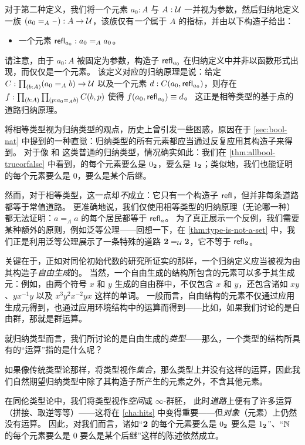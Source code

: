 对于第二种定义，我们将一个元素 $a_0:A$ 与 $A:\mathcal{U}$ 一并视为参数，然后归纳地定义一族 $(a_0 =_A \mathord{\hspace{1pt}\text{--}\hspace{1pt}}):A\to \mathcal{U}$，该族仅有\emph{一个}属于 $A$ 的指标，并由以下构造子给出：

\begin{itemize}
\item 一个元素 $\mathsf{refl}_{a_0} : a_0 =_A a_0$。
\end{itemize}

请注意，由于 $a_0:A$ 被固定为参数，构造子 $\mathsf{refl}_{a_0}$ 在归纳定义中并非以函数形式出现，而仅仅是一个元素。
该定义对应的归纳原理是说：给定 $C:\prd{b:A} (a_0 =_A b) \to \type$ 以及一个元素 $d:C(a_0,\mathsf{refl}_{a_0})$，则存在 $f:\prd{b:A}{p:a_0 =_A b} C(b,p)$ 使得 $f(a_0,\mathsf{refl}_{a_0})\equiv d$。
这正是相等类型的基于点的道路归纳原理。

将相等类型视为归纳类型的观点，历史上曾引发一些困惑，原因在于 \cref{sec:bool-nat} 中提到的一种直觉：归纳类型的所有元素都应当通过反复应用其构造子来得到。
对于像 \bool 和 \nat 这类普通的归纳类型，情况确实如此：我们在 \cref{thm:allbool-trueorfalse} 中看到，\bool 的每个元素要么是 ${0_{\mathbf{2}}}$，要么是 ${1_{\mathbf{2}}}$；类似地，我们也能证明 \nat 的每个元素要么是 $0$，要么是某个后继。

然而，对于相等类型，这一点却\emph{不}成立：它只有一个构造子 $\mathsf{refl}_{}$，但并非每条道路都等于常值道路。
更准确地说，我们仅使用相等类型的归纳原理（无论哪一种）都无法证明：$a=_A a$ 的每个居民都等于 $\mathsf{refl}_{a}$。
为了真正展示一个反例，我们需要某种额外的原则，例如泛等公理——回想一下，在 \cref{thm:type-is-not-a-set} 中，我们正是利用泛等公理展示了一条特殊的道路 $\mathbf{2}=_{\mathcal{U}}\mathbf{2}$，它不等于 $\mathsf{refl}_{\mathbf{2}}$。

%
%
关键在于，正如对同伦初始代数的研究所证实的那样，一个归纳定义应当被视为由其构造子\emph{自由生成}的。
当然，一个自由生成的结构所包含的元素可以多于其生成元：例如，由两个符号 $x$ 和 $y$ 生成的自由群中，不仅包含 $x$ 和 $y$，还包含诸如 $xy$、$yx^{-1}y$ 以及 $x^3y^2x^{-2}yx$ 这样的单词。
一般而言，自由结构的元素不仅通过应用生成元得到，也通过应用环境结构中的运算而得到——比如，如果我们讨论的是自由群，那就是群运算。

就归纳类型而言，我们所讨论的是自由生成的\emph{类型}——那么，一个类型的结构所具有的``运算''指的是什么呢？

如果像传统类型论那样，将类型视作\emph{集合}，那么类型上并没有这样的运算，因此我们自然期望归纳类型中除了其构造子所产生的元素之外，不含其他元素。

在同伦类型论中，我们将类型视作\emph{空间}或 $\infty$-群胚，%
此时\emph{道路}上便有了许多运算（拼接、取逆等等）——这将在 \cref{cha:hits} 中变得重要——但\emph{对象}（元素）上仍然没有运算。
因此，对我们而言，诸如``$\mathbf{2}$ 的每个元素要么是 ${0_{\mathbf{2}}}$ 要么是 ${1_{\mathbf{2}}}$''、``$\mathbb{N}$ 的每个元素要么是 $0$ 要么是某个后继''这样的陈述依然成立。

